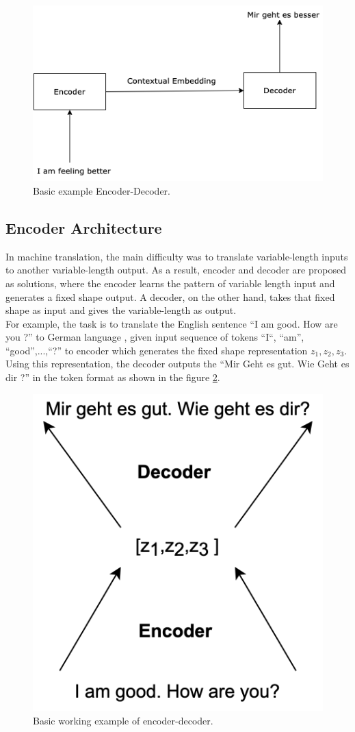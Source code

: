 \documentclass[%
	BCOR=8mm, %
	DIV=12,
	toc=bibliography, %
	toc=listof, %
	oneside, %
	egregdoesnotlikesansseriftitles, %
	]{scrbook}
\begin{document}
\begin{figure}[h!]
\centering
\includegraphics[width=.50\textwidth]{img/encoderDecoder.png}
\caption[Basic example of encoder-decoder]{Basic example Encoder-Decoder.}
\label{diag:EncoderDecoder}
\end{figure}

\subsection{Encoder Architecture}
In machine translation, the main difficulty was to translate variable-length inputs to another variable-length output. As a result, encoder and decoder are proposed as solutions, where the encoder learns the pattern of variable length input and generates a fixed shape output. A decoder, on the other hand, takes that fixed shape as input and gives the variable-length as output. \\
For example, the task is to translate the English sentence ``I am good. How are you ?'' to German language , given input sequence of tokens ``I``, ``am'', ``good'',...,``?'' to encoder which generates the fixed shape representation $z_{1},z_{2},z_{3}$. Using this representation, the decoder outputs the ``Mir Geht es gut. Wie Geht es dir ?'' in the token format as shown in the figure \ref{diag:EncoderDecoderExp}.\\
\begin{figure}[H]
    \centering
    \includegraphics[width=.30\textwidth]{img/EncoderDecoder2.png}
    \caption[Basic example of encoder-decoder working]{Basic working example of encoder-decoder.}
    \label{diag:EncoderDecoderExp}
\end{figure}
\end{document}
